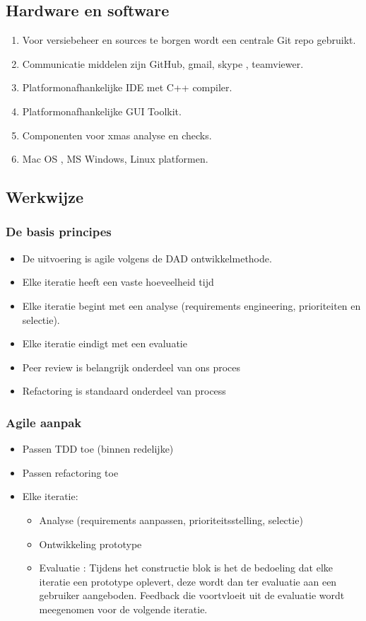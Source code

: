 \subsection{Hardware en software}
\begin{enumerate}
	\item Voor versiebeheer en sources te borgen wordt een centrale Git repo gebruikt.
	\item Communicatie middelen zijn GitHub, gmail, skype , teamviewer.
	\item Platformonafhankelijke IDE met C++ compiler.
	\item Platformonafhankelijke GUI Toolkit.
	\item Componenten voor xmas analyse en checks.
	\item Mac OS , MS Windows, Linux platformen.
\end{enumerate}


\subsection{Werkwijze}
\subsubsection{De basis principes}
\begin{itemize}
 \item De uitvoering is agile volgens de DAD ontwikkelmethode.
 \item Elke iteratie heeft een vaste hoeveelheid tijd
 \item Elke iteratie begint met een analyse (requirements engineering, prioriteiten en selectie).     \item Elke iteratie eindigt met een evaluatie
\item Peer review is belangrijk onderdeel van ons proces
 \item Refactoring is standaard onderdeel van process
\end{itemize}

\subsubsection{Agile aanpak}
\begin{itemize}
 \item Passen TDD toe (binnen redelijke)
 \item Passen refactoring toe
 \item Elke iteratie:
 \begin{itemize}
   \item Analyse (requirements aanpassen, prioriteitsstelling, selectie)
   \item Ontwikkeling prototype
   \item Evaluatie : Tijdens het constructie blok is het de bedoeling dat elke iteratie een prototype oplevert, deze wordt dan ter evaluatie aan een gebruiker aangeboden. Feedback die voortvloeit uit de evaluatie wordt meegenomen voor de volgende iteratie.
 \end{itemize}
\end{itemize}



